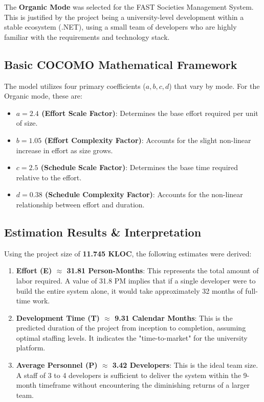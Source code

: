 \documentclass[12pt,a4paper]{article}
\begin{document}
The \textbf{Organic Mode} was selected for the FAST Societies Management System. This is justified by the project being a university-level development within a stable ecosystem (.NET), using a small team of developers who are highly familiar with the requirements and technology stack.

\subsection{Basic COCOMO Mathematical Framework}
The model utilizes four primary coefficients ($a, b, c, d$) that vary by mode. For the Organic mode, these are:
\begin{itemize}
    \item \textbf{$a = 2.4$ (Effort Scale Factor)}: Determines the base effort required per unit of size.
    \item \textbf{$b = 1.05$ (Effort Complexity Factor)}: Accounts for the slight non-linear increase in effort as size grows.
    \item \textbf{$c = 2.5$ (Schedule Scale Factor)}: Determines the base time required relative to the effort.
    \item \textbf{$d = 0.38$ (Schedule Complexity Factor)}: Accounts for the non-linear relationship between effort and duration.
\end{itemize}

\subsection{Estimation Results \& Interpretation}
Using the project size of \textbf{11.745 KLOC}, the following estimates were derived:

\begin{enumerate}
    \item \textbf{Effort (E) $\approx$ 31.81 Person-Months}: This represents the total amount of labor required. A value of 31.8 PM implies that if a single developer were to build the entire system alone, it would take approximately 32 months of full-time work.
    \item \textbf{Development Time (T) $\approx$ 9.31 Calendar Months}: This is the predicted duration of the project from inception to completion, assuming optimal staffing levels. It indicates the "time-to-market" for the university platform.
    \item \textbf{Average Personnel (P) $\approx$ 3.42 Developers}: This is the ideal team size. A staff of 3 to 4 developers is sufficient to deliver the system within the 9-month timeframe without encountering the diminishing returns of a larger team.
\end{enumerate}
\end{document}
